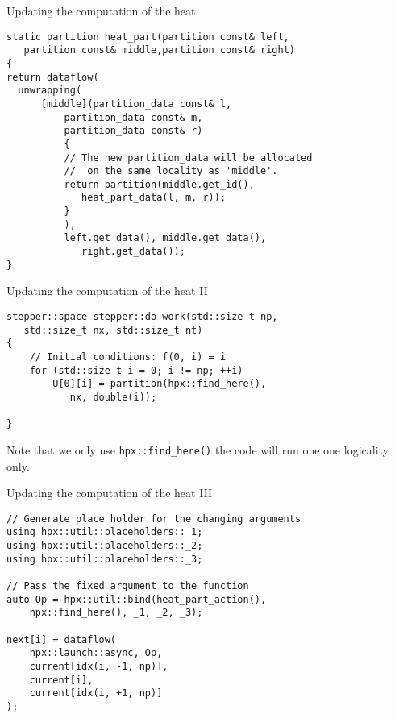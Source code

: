 \documentclass[\classoption]{beamer}
\begin{document}
\begin{frame}[fragile]{Updating the computation of the heat}

\begin{lstlisting}
static partition heat_part(partition const& left, 
   partition const& middle,partition const& right)
{
return dataflow(
  unwrapping(
      [middle](partition_data const& l, 
          partition_data const& m,
          partition_data const& r)
          {
          // The new partition_data will be allocated
          //  on the same locality as 'middle'.
          return partition(middle.get_id(), 
             heat_part_data(l, m, r));
          }
          ),
          left.get_data(), middle.get_data(), 
             right.get_data());
}
\end{lstlisting}

\end{frame}

\begin{frame}[fragile]{Updating the computation of the heat II}

\begin{lstlisting}
stepper::space stepper::do_work(std::size_t np, 
   std::size_t nx, std::size_t nt)
{
    // Initial conditions: f(0, i) = i
    for (std::size_t i = 0; i != np; ++i)
        U[0][i] = partition(hpx::find_here(), 
           nx, double(i));

}
\end{lstlisting}
\vspace{0.25cm}
Note that we only use \lstinline|hpx::find_here()| the code will run one one logicality only.
\end{frame}

\begin{frame}[fragile]{Updating the computation of the heat III}

\begin{lstlisting}
// Generate place holder for the changing arguments
using hpx::util::placeholders::_1;
using hpx::util::placeholders::_2;
using hpx::util::placeholders::_3;

// Pass the fixed argument to the function
auto Op = hpx::util::bind(heat_part_action(), 
    hpx::find_here(), _1, _2, _3);
    
next[i] = dataflow(
    hpx::launch::async, Op,
    current[idx(i, -1, np)], 
    current[i], 
    current[idx(i, +1, np)]
);
\end{lstlisting}

\end{frame}
\end{document}
